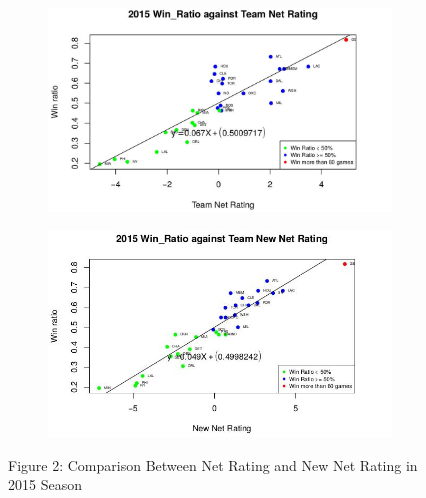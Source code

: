 \documentclass[11pt]{article}
\begin{document}
\begin{figure}[h!]
  \centering
  \begin{subfigure}[b]{0.45\linewidth}
    \includegraphics[width=\linewidth]{nr_15.jpg}
  \end{subfigure}
  \begin{subfigure}[b]{0.45\linewidth}
    \includegraphics[width=\linewidth]{new_nr_15.jpg}
  \end{subfigure}
\bigskip

Figure 2: Comparison Between Net Rating and New Net Rating in 2015 Season
\end{figure}
\end{document}
